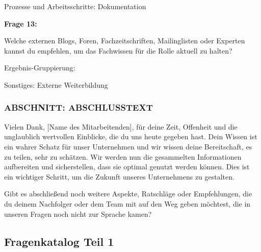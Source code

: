 \documentclass[
  10pt,
  ngerman,
  a4paper,
  toc=graduated,
  numbers=noenddot,
  headings=standardclasses,
  nonumberlist
]{scrartcl}
\renewcommand{\arraystretch}{1.0}
\begin{document}
Prozesse und Arbeitsschritte: Dokumentation

\textbf{Frage 13:}

Welche externen Blogs, Foren, Fachzeitschriften, Mailinglisten oder Experten kannst du empfehlen, um das Fachwissen für die Rolle aktuell zu halten?

Ergebnis-Gruppierung:

Sonstiges: Externe Weiterbildung

\subsubsection*{ABSCHNITT: ABSCHLUSSTEXT}

Vielen Dank, [Name des Mitarbeitenden], für deine Zeit, Offenheit und die unglaublich wertvollen Einblicke, die du uns heute gegeben hast. Dein Wissen ist ein wahrer Schatz für unser Unternehmen und wir wissen deine Bereitschaft, es zu teilen, sehr zu schätzen. Wir werden nun die gesammelten Informationen aufbereiten und sicherstellen, dass sie optimal genutzt werden können. Dies ist ein wichtiger Schritt, um die Zukunft unseres Unternehmens zu gestalten.

Gibt es abschließend noch weitere Aspekte, Ratschläge oder Empfehlungen, die du deinem Nachfolger oder dem Team mit auf den Weg geben möchtest, die in unseren Fragen noch nicht zur Sprache kamen?

\clearpage
\subsection{Fragenkatalog Teil 1}
\label{anhang_fragenkatalog_1}

\setlength{\tabcolsep}{3.5pt}
\renewcommand{\arraystretch}{1.0}
\end{document}
